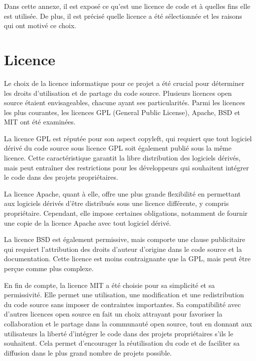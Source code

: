 Dans cette annexe, il est exposé ce qu'est une licence de code et à quelles fins elle est utilisée.
De plus, il est précisé quelle licence a été sélectionnée et les raisons qui ont motivé ce choix.

\section{Licence}

Le choix de la licence informatique pour ce projet a été crucial pour déterminer les droits d'utilisation et de partage du code source.
Plusieurs licences open source étaient envisageables, chacune ayant ses particularités.
Parmi les licences les plus courantes, les licences GPL (General Public License), Apache, BSD et MIT ont été examinées.

La licence GPL est réputée pour son aspect copyleft, qui requiert que tout logiciel dérivé du code source sous licence GPL soit également publié sous la même licence.
Cette caractéristique garantit la libre distribution des logiciels dérivés, mais peut entraîner des restrictions pour les développeurs qui souhaitent intégrer le code dans des projets propriétaires.

La licence Apache, quant à elle, offre une plus grande flexibilité en permettant aux logiciels dérivés d'être distribués sous une licence différente, y compris propriétaire.
Cependant, elle impose certaines obligations, notamment de fournir une copie de la licence Apache avec tout logiciel dérivé.

La licence BSD est également permissive, mais comporte une clause publicitaire qui requiert l'attribution des droits d'auteur d'origine dans le code source et la documentation.
Cette licence est moins contraignante que la GPL, mais peut être perçue comme plus complexe.

En fin de compte, la licence MIT a été choisie pour sa simplicité et sa permissivité.
Elle permet une utilisation, une modification et une redistribution du code source sans imposer de contraintes importantes.
Sa compatibilité avec d'autres licences open source en fait un choix attrayant pour favoriser la collaboration et le partage dans la communauté open source, tout en donnant aux utilisateurs la liberté d'intégrer le code dans des projets propriétaires s'ils le souhaitent.
Cela permet d'encourager la réutilisation du code et de faciliter sa diffusion dans le plus grand nombre de projets possible.